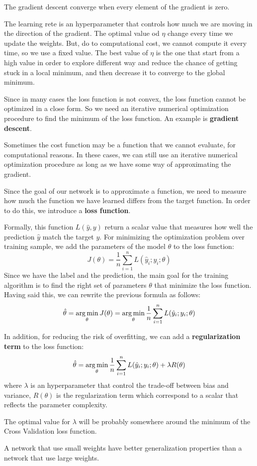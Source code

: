 \begin{note}
    The gradient descent converge when every element of the gradient is zero.
\end{note}

The learning rete is an hyperparameter that controls how much we are moving in the
direction of the gradient. The optimal value od $\eta$ change every time we update
the weights. But, do to computational cost, we cannot compute it every time, so we
use a fixed value. The best value of $\eta$ is the one that start from a high value
in order to explore different way and reduce the chance of getting stuck in a local
minimum, and then decrease it to converge to the global minimum.

Since in many cases the loss function is not convex, the loss function cannot be
optimized in a close form. So we need an iterative numerical optimization
procedure to find the minimum of the loss function. An example is \textbf{gradient
    descent}.

Sometimes the cost function may be a function that we cannot evaluate, for
computational reasons. In these cases, we can still use an iterative numerical
optimization procedure as long as we have some way of approximating the gradient.

Since the goal of our network is to approximate a function, we need to measure how
much the function we have learned differs from the target function. In order to
do this, we introduce a \textbf{loss function}.

Formally, this function $L(\hat{y}, y)$ return a scalar value that measures how
well the prediction $\hat{y}$ match the target $y$. For minimizing the optimization
problem over training sample, we add the parameters of the model $\theta$ to the
loss function:
\begin{equation}
    J(\theta) = \frac{1}{n} \sum_{i=1}^n L(\hat{y}_i; y_i; \theta)
\end{equation}
Since we have the label and the prediction, the main goal for the training algorithm
is to find the right set of parameters $\theta$ that minimize the loss function.
Having said this, we can rewrite the previous formula as follows:
\begin{equation}
    \hat{\theta} = \operatorname*{arg\,min}_{\theta} J(\theta) = \operatorname*{arg\,min}_{\theta} \frac{1}{n}
    \sum_{i=1}^n L(\hat{y}_i; y_i; \theta)
\end{equation}

In addition, for reducing the risk of overfitting, we can add a \textbf{regularization
    term} to the loss function:
\begin{equation}
    \hat{\theta} = \operatorname*{arg\,min}_{\theta} \frac{1}{n} \sum_{i=1}^n L(\hat{y}_i; y_i; \theta)
    + \lambda R(\theta)
\end{equation}
where $\lambda$ is an hyperparameter that control the trade-off between bias and
variance, $R(\theta)$ is the regularization term which correspond to a scalar that
reflects the parameter complexity.

The optimal value for $\lambda$ will be probably somewhere around the minimum of
the Cross Validation loss function.

\begin{note}
    A network that use small weights have better generalization properties than
    a network that use large weights.
\end{note}